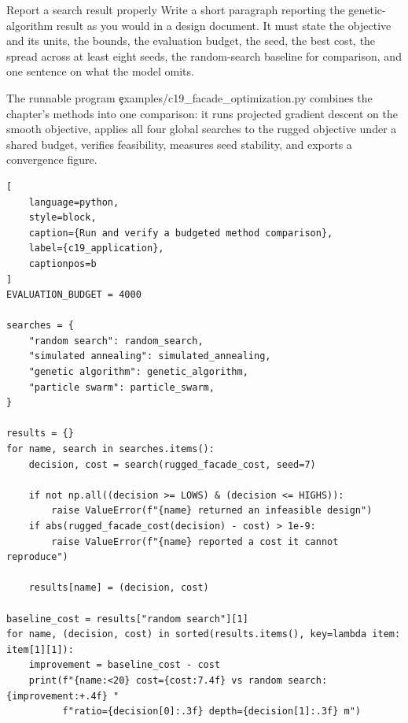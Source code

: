 \begin{TryBox}{Report a search result properly}
Write a short paragraph reporting the genetic-algorithm result as you would in a
design document. It must state the objective and its units, the bounds, the
evaluation budget, the seed, the best cost, the spread across at least eight
seeds, the random-search baseline for comparison, and one sentence on what the
model omits.
\end{TryBox}

\label{sec:c19-application}

The runnable program \c{examples/c19_facade_optimization.py} combines the
chapter's methods into one comparison: it runs projected gradient descent on the
smooth objective, applies all four global searches to the rugged objective under
a shared budget, verifies feasibility, measures seed stability, and exports a
convergence figure.

\begin{lstlisting}[
    language=python,
    style=block,
    caption={Run and verify a budgeted method comparison},
    label={c19_application},
    captionpos=b
]
EVALUATION_BUDGET = 4000

searches = {
    "random search": random_search,
    "simulated annealing": simulated_annealing,
    "genetic algorithm": genetic_algorithm,
    "particle swarm": particle_swarm,
}

results = {}
for name, search in searches.items():
    decision, cost = search(rugged_facade_cost, seed=7)

    if not np.all((decision >= LOWS) & (decision <= HIGHS)):
        raise ValueError(f"{name} returned an infeasible design")
    if abs(rugged_facade_cost(decision) - cost) > 1e-9:
        raise ValueError(f"{name} reported a cost it cannot reproduce")

    results[name] = (decision, cost)

baseline_cost = results["random search"][1]
for name, (decision, cost) in sorted(results.items(), key=lambda item: item[1][1]):
    improvement = baseline_cost - cost
    print(f"{name:<20} cost={cost:7.4f} vs random search: {improvement:+.4f} "
          f"ratio={decision[0]:.3f} depth={decision[1]:.3f} m")
\end{lstlisting}

